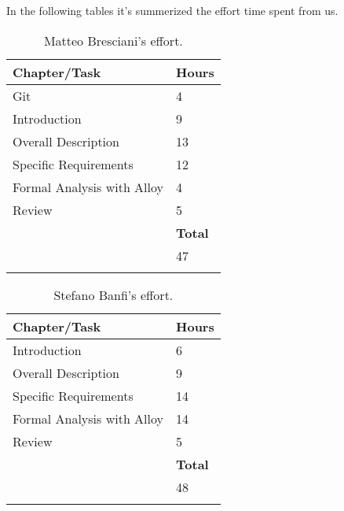 In the following tables it's summerized the effort time spent from us. 
	\begin{longtable}{| p{5 cm} | p{1 cm} |} 
			\hline
			{\bf Chapter/Task} & {\bf Hours}\\
			\hline
            Git & 4 \\
			Introduction & 9 \\
			Overall Description & 13  \\
			Specific Requirements &  12 \\
			Formal Analysis with Alloy & 4  \\
			Review & 5 \\
			\hline
			&  {\bf Total} \\
			\hline
			&  47 \\
			\hline
			\caption{Matteo Bresciani's effort.}
		\end{longtable}

			\begin{longtable}{| p{5 cm} | p{1 cm} |} 
			\hline
			{\bf Chapter/Task} & {\bf Hours}\\
			\hline
			Introduction & 6 \\
			Overall Description & 9 \\
			Specific Requirements & 14 \\
			Formal Analysis with Alloy & 14 \\
			Review & 5 \\
			\hline
			&  {\bf Total} \\
			\hline
			&  48 \\
			\hline
			\caption{Stefano Banfi's effort.}
		\end{longtable}
	